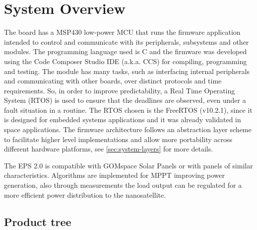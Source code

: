 %
%
%
%
%

%
%
%
%
%

\chapter{System Overview} \label{ch:system-overview}

The board has a MSP430 low-power MCU that runs the firmware application intended to control and communicate with its peripherals, subsystems and other modules. The programming language used is C and the firmware was developed using the Code Composer Studio IDE (a.k.a. CCS) for compiling, programming and testing. The module has many tasks, such as interfacing internal peripherals and communicating with other boards, over distinct protocols and time requirements. 
So, in order to improve predictability, a Real Time Operating System (RTOS) is used to ensure that the deadlines are observed, even under a fault situation in a routine. The RTOS chosen is the FreeRTOS (v10.2.1), since it is designed for embedded systems applications and it was already validated in space applications. The firmware architecture follows an abstraction layer scheme to facilitate higher level implementations and allow more portability across different hardware platforms, see \autoref{sec:system-layers} for more details.

The EPS 2.0 is compatible with GOMspace Solar Panels or with panels of similar characteristics. Algorithms are implemented for MPPT improving power generation, also through measurements the load output can be regulated for a more efficient power distribution to the nanosatellite.

\section{Product tree}

